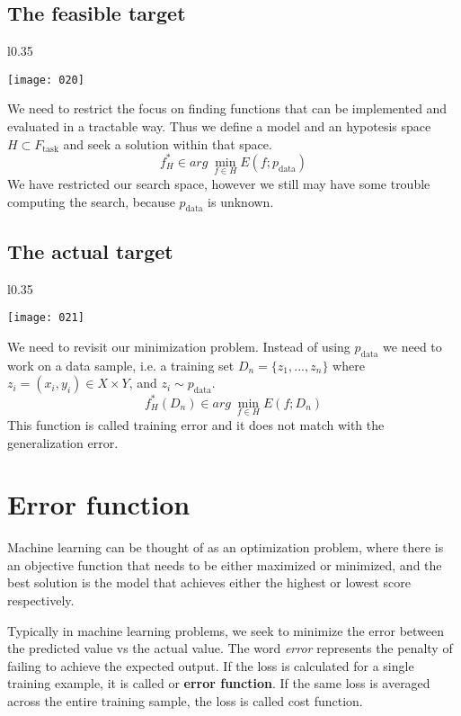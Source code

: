 \subsection{The feasible target}
\begin{wrapfigure}{l}{0.35\textwidth}
\begin{center}
    \texttt{[image: 020]}
\end{center}
\label{fig:020}
\end{wrapfigure}
We need to restrict the focus on finding functions that can be implemented and evaluated in a tractable way. Thus we define a model and an hypotesis space \(H \subset F_{\text{task}}\) and seek a solution within that space.
\[f^*_H \in arg\ \min_{f\in H} E(f; p_{\text{data}})\]
We have restricted our search space, however we still may have some trouble computing the search, because \(p_{\text{data}}\) is unknown.

\subsection{The actual target}
\begin{wrapfigure}{l}{0.35\textwidth}
\begin{center}
    \texttt{[image: 021]}
\end{center}
\label{fig:021}
\end{wrapfigure}
We need to revisit our minimization problem. Instead of using \(p_{\text{data}}\) we need to work on a data sample, i.e. a training set \(D_n=\{z_1,...,z_n\}\) where \(z_i=(x_i,y_i) \in X \times Y\), and \(z_i \sim p_{\text{data}}\).
\[f^*_H(D_n) \in arg\ \min_{f \in H} E(f; D_n)\]
This function is called training error and it does not match with the generalization error.

\section{Error function}
Machine learning can be thought of as an optimization problem, where there is an objective function that needs to be either maximized or minimized, and the best solution is the model that achieves either the highest or lowest score respectively. 

Typically in machine learning problems, we seek to minimize the error between the predicted value vs the actual value. The word \emph{error} represents the penalty of failing to achieve the expected output. If the loss is calculated for a single training example, it is called or \textbf{error function}. If the same loss is averaged across the entire training sample, the loss is called cost function.

